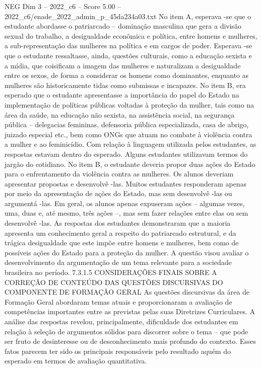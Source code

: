 \begin{textsample}{NEG Dim 3 – 2022\_c6 – Score 5.00 – 2022\_c6/enade\_2022\_admin\_p\_45da234a03.txt}
No item A, esperava -se que o estudante abordasse o patriarcado – dominação masculina que gera a divisão sexual do trabalho, a desigualdade econômica e política, entre homens e mulheres, a sub-representação das mulheres na política e em cargos de poder.
Esperava -se que o estudante ressaltasse, ainda, questões culturais, como a educação sexista e a mídia, que coisificam a imagem das mulheres e naturalizam a desigualdade entre os sexos, de forma a considerar os homens como dominantes, enquanto as mulheres são historicamente tidas como submissas e incapazes.
No item B, era esperado que o estudante apresentasse a importância do papel do Estado na implementação de políticas públicas voltadas à proteção da mulher, tais como na área da saúde, na educação não sexista, na assistência social, na segurança pública – delegacias femininas, defensoria pública especializada, casa de abrigo, juizado especial etc., bem como ONGs que atuam no combate à violência contra a mulher e ao feminicídio.
Com relação à linguagem utilizada pelos estudantes, as respostas estavam dentro do esperado.
Alguns estudantes utilizavam termos do jargão do cotidiano.
No item B, o estudante deveria propor duas ações do Estado para o enfrentamento da violência contra as mulheres.
Os alunos deveriam apresentar propostas e desenvolvê -las.
Muitos estudantes responderam apenas por meio da apresentação de ações do Estado, mas sem desenvolvê -las ou argumentá -las.
Em geral, os alunos apenas expuseram ações – algumas vezes, uma, duas e, até mesmo, três ações –, mas sem fazer relações entre elas ou sem desenvolvê -las.
As respostas dos estudantes demonstraram que a maioria apresenta um conhecimento geral a respeito do patriarcado estrutural, e da trágica desigualdade que este impõe entre homens e mulheres, bem como de possíveis ações do Estado para a proteção da mulher.
A questão visou avaliar o desenvolvimento da argumentação de um tema relevante para a sociedade brasileira no período. 7.3.1.5 CONSIDERAÇÕES FINAIS SOBRE A CORREÇÃO DE CONTEÚDO DAS QUESTÕES DISCURSIVAS DO COMPONENTE DE FORMAÇÃO GERAL As questões discursivas da área de Formação Geral abordaram temas atuais e proporcionaram a avaliação de competências importantes entre as previstas pelas suas Diretrizes Curriculares.
A análise das respostas revelou, principalmente, dificuldade dos estudantes em relação à seleção de argumentos sólidos para discorrer sobre o tema – que pode ser fruto de desinteresse ou de desconhecimento mais profundo do contexto.
Esses fatos parecem ter sido os principais responsáveis pelo resultado aquém do esperado em termos de avaliação quantitativa.

\end{textsample}
